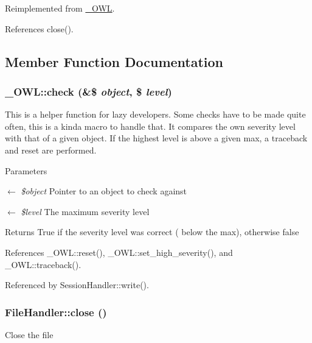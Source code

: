 Reimplemented from \hyperlink{class__OWL_a44fd2222476a3109286cc82d92b6bbcc}{\_\-OWL}.



References close().



\subsection{Member Function Documentation}
\subsubsection[{check}]{\setlength{\rightskip}{0pt plus 5cm}\_\-OWL::check (\&\$ {\em object}, \/  \$ {\em level})}\label{class__OWL_ad6f4f6946f40199dd0333cf219fa500e}
This is a helper function for lazy developers. Some checks have to be made quite often, this is a kinda macro to handle that. It compares the own severity level with that of a given object. If the highest level is above a given max, a traceback and reset are performed.


\begin{DoxyParams}{Parameters}
\item[\mbox{$\leftarrow$} {\em \$object}]Pointer to an object to check against \item[\mbox{$\leftarrow$} {\em \$level}]The maximum severity level \end{DoxyParams}
\begin{DoxyReturn}{Returns}
True if the severity level was correct ( below the max), otherwise false 
\end{DoxyReturn}


References \_\-OWL::reset(), \_\-OWL::set\_\-high\_\-severity(), and \_\-OWL::traceback().



Referenced by SessionHandler::write().

\subsubsection[{close}]{\setlength{\rightskip}{0pt plus 5cm}FileHandler::close ()}\label{classFileHandler_aa48e7c3b67346e29b194d2f0ac5dd1f8}
Close the file 

